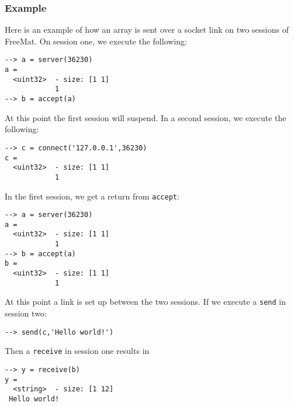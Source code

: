 \subsubsection{Example}
Here is an example of how an array is sent over a socket link on two sessions of FreeMat.  On session one, we execute the following:
\begin{verbatim}
--> a = server(36230)
a =
  <uint32>  - size: [1 1]
            1
--> b = accept(a)
\end{verbatim}
At this point the first session will suspend.  In a second session, we execute the following:
\begin{verbatim}
--> c = connect('127.0.0.1',36230)
c =
  <uint32>  - size: [1 1]
            1
\end{verbatim}
In the first session, we get a return from \verb|accept|:
\begin{verbatim}
--> a = server(36230)
a =
  <uint32>  - size: [1 1]
            1
--> b = accept(a)
b =
  <uint32>  - size: [1 1]
            1
\end{verbatim}
At this point a link is set up between the two sessions.  If we execute a \verb|send| in session two:
\begin{verbatim}
--> send(c,'Hello world!')
\end{verbatim}
Then a \verb|receive| in session one results in
\begin{verbatim}
--> y = receive(b)
y =
  <string>  - size: [1 12]
 Hello world!
\end{verbatim}
